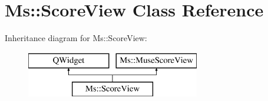 \hypertarget{class_ms_1_1_score_view}{}\section{Ms\+:\+:Score\+View Class Reference}
\label{class_ms_1_1_score_view}
Inheritance diagram for Ms\+:\+:Score\+View\+:\begin{figure}[H]
\begin{center}
\leavevmode
\includegraphics[height=2.000000cm]{class_ms_1_1_score_view}
\end{center}
\end{figure}
